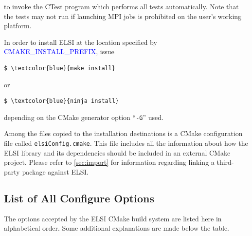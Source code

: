 \documentclass{report}
\begin{document}
to invoke the CTest program which performs all tests automatically.  Note that the tests may not run if launching MPI jobs is prohibited on the user's working platform.

In order to install ELSI at the location specified by \textcolor{blue}{CMAKE\_INSTALL\_PREFIX}, issue
\begin{tcolorbox}
\begin{Verbatim}[commandchars=\\\{\}]
$ \textcolor{blue}{make install}
\end{Verbatim}
\end{tcolorbox}

or
\begin{tcolorbox}
\begin{Verbatim}[commandchars=\\\{\}]
$ \textcolor{blue}{ninja install}
\end{Verbatim}
\end{tcolorbox}

depending on the CMake generator option ``\verb+-G+'' used.

Among the files copied to the installation destinations is a CMake configuration file called \texttt{elsiConfig.cmake}.  This file includes all the information about how the ELSI library and its dependencies should be included in an external CMake project.  Please refer to \ref{sec:import} for information regarding linking a third-party package against ELSI.

\subsection{List of All Configure Options}
\label{subsec:config_keywords}
The options accepted by the ELSI CMake build system are listed here in alphabetical order.  Some additional explanations are made below the table.
\end{document}
